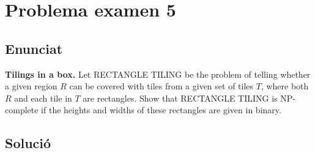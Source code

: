 \section{Problema examen 5}
\subsection{Enunciat}
\textbf{Tilings in a box.} Let RECTANGLE TILING be the problem of telling whether a given region $R$ can be covered with tiles from a given set of tiles $T$, where both $R$ and each tile in $T$ are rectangles. Show that RECTANGLE TILING is NP-complete if the heights and widths of these rectangles are given in binary.

\subsection{Solució}